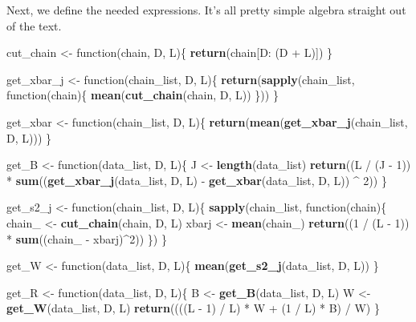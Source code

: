\documentclass[]{article}
\newenvironment{Shaded}{\begin{snugshade}}{\end{snugshade}}
\newcommand{\KeywordTok}[1]{\textcolor[rgb]{0.13,0.29,0.53}{\textbf{{#1}}}}
\newcommand{\DecValTok}[1]{\textcolor[rgb]{0.00,0.00,0.81}{{#1}}}
\newcommand{\StringTok}[1]{\textcolor[rgb]{0.31,0.60,0.02}{{#1}}}
\newcommand{\NormalTok}[1]{{#1}}
\begin{document}
Next, we define the needed expressions. It's all pretty simple algebra
straight out of the text.

\begin{Shaded}
\begin{Highlighting}[]
\NormalTok{cut_chain <-}\StringTok{ }\NormalTok{function(chain, D, L)\{}
  \KeywordTok{return}\NormalTok{(chain[D:}\StringTok{ }\NormalTok{(D +}\StringTok{ }\NormalTok{L)])}
\NormalTok{\}}

\NormalTok{get_xbar_j <-}\StringTok{ }\NormalTok{function(chain_list, D, L)\{}
  \KeywordTok{return}\NormalTok{(}\KeywordTok{sapply}\NormalTok{(chain_list, function(chain)\{}
    \KeywordTok{mean}\NormalTok{(}\KeywordTok{cut_chain}\NormalTok{(chain, D, L))}
  \NormalTok{\}))}
\NormalTok{\}}

\NormalTok{get_xbar <-}\StringTok{ }\NormalTok{function(chain_list, D, L)\{}
  \KeywordTok{return}\NormalTok{(}\KeywordTok{mean}\NormalTok{(}\KeywordTok{get_xbar_j}\NormalTok{(chain_list, D, L)))}
\NormalTok{\}}

\NormalTok{get_B <-}\StringTok{ }\NormalTok{function(data_list, D, L)\{}
  \NormalTok{J <-}\StringTok{ }\KeywordTok{length}\NormalTok{(data_list)}
  \KeywordTok{return}\NormalTok{((L /}\StringTok{ }\NormalTok{(J -}\StringTok{ }\DecValTok{1}\NormalTok{)) *}\StringTok{ }\KeywordTok{sum}\NormalTok{((}\KeywordTok{get_xbar_j}\NormalTok{(data_list, D, L) -}\StringTok{ }\KeywordTok{get_xbar}\NormalTok{(data_list, D, L)) ^}\StringTok{ }\DecValTok{2}\NormalTok{))}
\NormalTok{\}}

\NormalTok{get_s2_j <-}\StringTok{ }\NormalTok{function(chain_list, D, L)\{}
  \KeywordTok{sapply}\NormalTok{(chain_list, function(chain)\{}
    \NormalTok{chain_ <-}\StringTok{ }\KeywordTok{cut_chain}\NormalTok{(chain, D, L)}
    \NormalTok{xbarj <-}\StringTok{ }\KeywordTok{mean}\NormalTok{(chain_)}
    \KeywordTok{return}\NormalTok{((}\DecValTok{1} \NormalTok{/}\StringTok{ }\NormalTok{(L -}\StringTok{ }\DecValTok{1}\NormalTok{)) *}\StringTok{ }\KeywordTok{sum}\NormalTok{((chain_ -}\StringTok{ }\NormalTok{xbarj)^}\DecValTok{2}\NormalTok{))}
  \NormalTok{\})}
\NormalTok{\}}

\NormalTok{get_W <-}\StringTok{ }\NormalTok{function(data_list, D, L)\{}
  \KeywordTok{mean}\NormalTok{(}\KeywordTok{get_s2_j}\NormalTok{(data_list, D, L))}
\NormalTok{\}}

\NormalTok{get_R <-}\StringTok{ }\NormalTok{function(data_list, D, L)\{}
  \NormalTok{B <-}\StringTok{ }\KeywordTok{get_B}\NormalTok{(data_list, D, L)}
  \NormalTok{W <-}\StringTok{ }\KeywordTok{get_W}\NormalTok{(data_list, D, L)}
  \KeywordTok{return}\NormalTok{((((L -}\StringTok{ }\DecValTok{1}\NormalTok{) /}\StringTok{ }\NormalTok{L) *}\StringTok{ }\NormalTok{W +}\StringTok{ }\NormalTok{(}\DecValTok{1} \NormalTok{/}\StringTok{ }\NormalTok{L) *}\StringTok{ }\NormalTok{B) /}\StringTok{ }\NormalTok{W)}
\NormalTok{\}}
\end{Highlighting}
\end{Shaded}
\end{document}
